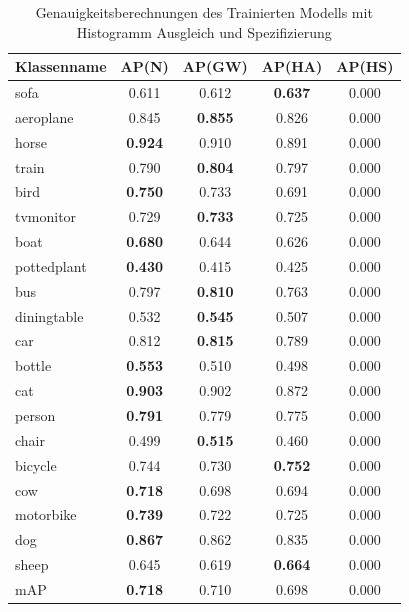 \documentclass[a4paper,12pt,oneside]{article}
\begin{document}
\begin{table}
[h]
\caption{Genauigkeitsberechnungen des Trainierten Modells mit Histogramm Ausgleich und Spezifizierung}
\centering
\begin{tabular}{|l|c|c|c|c|}
\hline
Klassenname & AP(N) & AP(GW) & AP(HA) & AP(HS)\\
\hline
sofa & 0.611 & 0.612 & \textbf{0.637} & 0.000\\ 
aeroplane & 0.845 & \textbf{0.855} & 0.826 & 0.000\\
horse & \textbf{0.924} & 0.910 & 0.891 & 0.000\\
train & 0.790 & \textbf{0.804} & 0.797 & 0.000\\
bird & \textbf{0.750} & 0.733 & 0.691 & 0.000\\ 
tvmonitor & 0.729 & \textbf{0.733} & 0.725 & 0.000\\
boat & \textbf{0.680} & 0.644 & 0.626 & 0.000\\
pottedplant & \textbf{0.430} & 0.415 & 0.425 & 0.000\\
bus & 0.797 & \textbf{0.810} & 0.763 & 0.000\\ 
diningtable & 0.532 & \textbf{0.545} & 0.507 & 0.000\\
car & 0.812 & \textbf{0.815} & 0.789 & 0.000\\
bottle & \textbf{0.553} & 0.510 & 0.498 & 0.000\\
cat & \textbf{0.903} & 0.902 & 0.872 & 0.000\\
person & \textbf{0.791} & 0.779 & 0.775 & 0.000\\
chair & 0.499 & \textbf{0.515} & 0.460 & 0.000\\
bicycle & 0.744 & 0.730 & \textbf{0.752} & 0.000\\
cow & \textbf{0.718} & 0.698 & 0.694 & 0.000\\
motorbike & \textbf{0.739} & 0.722 & 0.725 & 0.000\\
dog & \textbf{0.867} & 0.862 & 0.835 & 0.000\\
sheep & 0.645 & 0.619 & \textbf{0.664} & 0.000\\
\hline
mAP & \textbf{0.718} & 0.710 & 0.698 & 0.000\\
\hline
\end{tabular}
\end{table}
\end{document}

